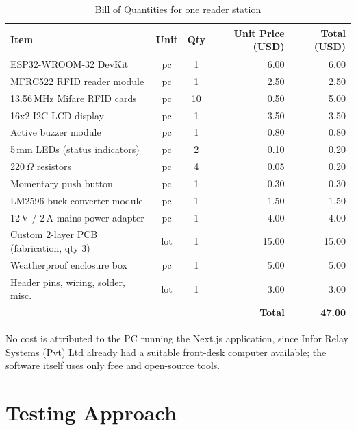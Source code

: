 \begin{table}[H]
    \centering
    \caption{Bill of Quantities for one reader station}
    \label{tab:boq}
    \begin{tabular}{@{}p{5.2cm}ccrr@{}}
        \toprule
        \textbf{Item} & \textbf{Unit} & \textbf{Qty} & \textbf{Unit Price (USD)} & \textbf{Total (USD)} \\
        \midrule
        ESP32-WROOM-32 DevKit & pc & 1 & 6.00 & 6.00 \\
        MFRC522 RFID reader module & pc & 1 & 2.50 & 2.50 \\
        13.56\,MHz Mifare RFID cards & pc & 10 & 0.50 & 5.00 \\
        16x2 I2C LCD display & pc & 1 & 3.50 & 3.50 \\
        Active buzzer module & pc & 1 & 0.80 & 0.80 \\
        5\,mm LEDs (status indicators) & pc & 2 & 0.10 & 0.20 \\
        220\,$\Omega$ resistors & pc & 4 & 0.05 & 0.20 \\
        Momentary push button & pc & 1 & 0.30 & 0.30 \\
        LM2596 buck converter module & pc & 1 & 1.50 & 1.50 \\
        12\,V / 2\,A mains power adapter & pc & 1 & 4.00 & 4.00 \\
        Custom 2-layer PCB (fabrication, qty 3) & lot & 1 & 15.00 & 15.00 \\
        Weatherproof enclosure box & pc & 1 & 5.00 & 5.00 \\
        Header pins, wiring, solder, misc. & lot & 1 & 3.00 & 3.00 \\
        \midrule
        \multicolumn{4}{r}{\textbf{Total}} & \textbf{47.00} \\
        \bottomrule
    \end{tabular}
\end{table}

No cost is attributed to the PC running the Next.js application, since Infor Relay Systems (Pvt) Ltd already had a suitable front-desk computer available; the software itself uses only free and open-source tools.

\section{Testing Approach}

